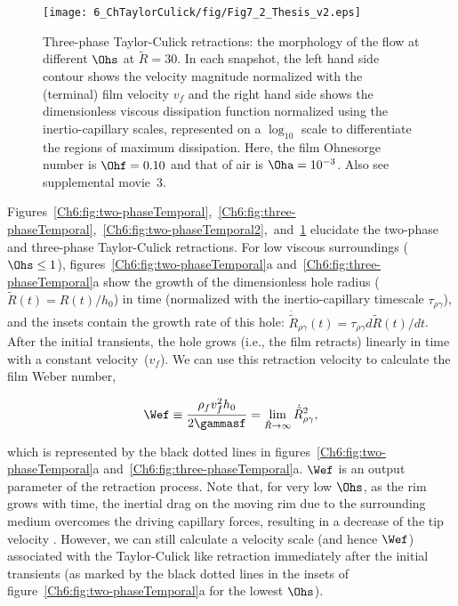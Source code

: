 \begin{figure}
	\centering
	\texttt{[image: 6\_ChTaylorCulick/fig/Fig7\_2\_Thesis\_v2.eps]}	
	\caption{Three-phase Taylor-Culick retractions: the morphology of the flow at different $\Ohs$ at $\tilde{R} = 30$. In each snapshot, the left hand side contour shows the velocity magnitude normalized with the (terminal) film velocity $v_f$ and the right hand side shows the dimensionless viscous dissipation function normalized using the inertio-capillary scales, represented on a $\log_{\text{10}}$ scale to differentiate the regions of maximum dissipation. Here, the film Ohnesorge number is $\Ohf = 0.10$ and that of air is $\Oha = 10^{-3}$. Also see supplemental movie~{\color{Myfig}3}.}
	\label{Ch6:fig:three-phaseTemporal2}
\end{figure}

Figures~\ref{Ch6:fig:two-phaseTemporal},~\ref{Ch6:fig:three-phaseTemporal},~\ref{Ch6:fig:two-phaseTemporal2},~and~\ref{Ch6:fig:three-phaseTemporal2} elucidate the two-phase and three-phase Taylor-Culick retractions. For low viscous surroundings ($\Ohs \le 1$), figures~\ref{Ch6:fig:two-phaseTemporal}a and~\ref{Ch6:fig:three-phaseTemporal}a show the growth of the dimensionless hole radius ($\tilde{R}(t) = R(t)/h_0$) in time (normalized with the inertio-capillary timescale $\tau_{\rho\gamma}$), and the insets contain the growth rate of this hole: $\dot{\tilde{R}}_{\rho\gamma} (t) = \tau_{\rho\gamma} d\tilde{R}(t)/dt$. After the initial transients, the hole grows (i.e., the film retracts) linearly in time with a constant velocity~($v_f$). We can use this retraction velocity to calculate the film Weber number, 

\begin{align}
	\label{Eqn::Weber definition}
	\Wef \equiv \frac{\rho_fv_f^2h_0}{2\gammasf} = \lim\limits_{\tilde{R} \to \infty}\dot{\tilde{R}}_{\rho\gamma}^2,
\end{align}

\noindent which is represented by the black dotted lines in figures~\ref{Ch6:fig:two-phaseTemporal}a and~\ref{Ch6:fig:three-phaseTemporal}a. $\Wef$ is an output parameter of the retraction process. Note that, for very low $\Ohs$, as the rim grows with time, the inertial drag on the moving rim due to the surrounding medium overcomes the driving capillary forces, resulting in a decrease of the tip velocity \citep[see insets of figure~\ref{Ch6:fig:two-phaseTemporal}a and][]{jian_deng_thoraval_2020}. However, we can still calculate a velocity scale (and hence $\Wef$) associated with the Taylor-Culick like retraction immediately after the initial transients (as marked by the black dotted lines in the insets of figure~\ref{Ch6:fig:two-phaseTemporal}a for the lowest $\Ohs$). 

